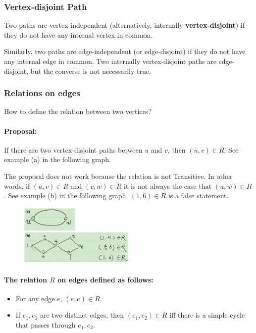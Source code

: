 \documentclass[en,hazy,blue,normal,12pt]{elegantnote}
\begin{document}
\subsubsection{Vertex-disjoint Path}
Two paths are vertex-independent (alternatively, internally 
\textbf{vertex-disjoint}) if they do not have any internal vertex in common. 

Similarly, two paths are edge-independent (or edge-disjoint) if they do not 
have any internal edge in common. Two internally vertex-disjoint paths 
are edge-disjoint, but the converse is not necessarily true.

\subsubsection{Relations on edges}
How to define the relation between two vertices?

\paragraph{Proposal:} If there are two vertex-disjoint paths between $u$ and 
$v$, then $(u, v) \in R$. See example (a) in the following graph.

The proposal does not work because the relation is not Transitive. In other 
words, if $(u, v) \in R$ and $(v, w) \in R$ it is not always the case that 
$(u, w) \in R$.
See example (b) in the following graph. $(1, 6) \in R$ is a false statement.

\begin{figure}[H]
\centering
\includegraphics[width=0.5\textwidth]{relation.png}
\end{figure}

\paragraph{The relation $R$ on edges defined as follows:}
\begin{itemize}
\item For any edge $e$, $(e,e) \in R$.
\item If $e_1, e_2$ are two distinct edges, then $(e_1, e_2) \in R$ iff there 
is a simple cycle that passes through $e_1, e_2$.
\end{itemize}
\end{document}
